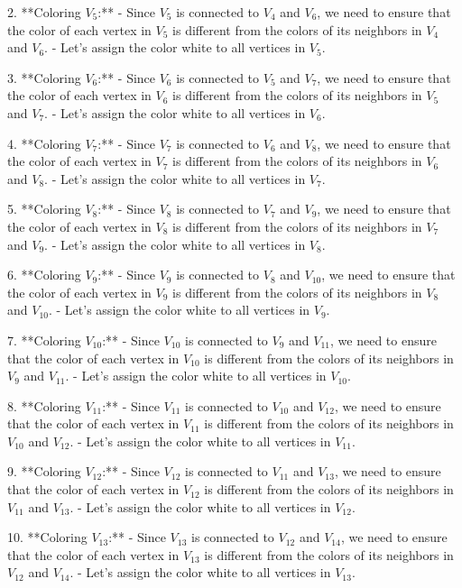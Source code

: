 2. **Coloring \(V_5\):**
   - Since \(V_5\) is connected to \(V_4\) and \(V_6\), we need to ensure that the color of each vertex in \(V_5\) is different from the colors of its neighbors in \(V_4\) and \(V_6\).
   - Let's assign the color white to all vertices in \(V_5\).

3. **Coloring \(V_6\):**
   - Since \(V_6\) is connected to \(V_5\) and \(V_7\), we need to ensure that the color of each vertex in \(V_6\) is different from the colors of its neighbors in \(V_5\) and \(V_7\).
   - Let's assign the color white to all vertices in \(V_6\).

4. **Coloring \(V_7\):**
   - Since \(V_7\) is connected to \(V_6\) and \(V_8\), we need to ensure that the color of each vertex in \(V_7\) is different from the colors of its neighbors in \(V_6\) and \(V_8\).
   - Let's assign the color white to all vertices in \(V_7\).

5. **Coloring \(V_8\):**
   - Since \(V_8\) is connected to \(V_7\) and \(V_9\), we need to ensure that the color of each vertex in \(V_8\) is different from the colors of its neighbors in \(V_7\) and \(V_9\).
   - Let's assign the color white to all vertices in \(V_8\).

6. **Coloring \(V_9\):**
   - Since \(V_9\) is connected to \(V_8\) and \(V_{10}\), we need to ensure that the color of each vertex in \(V_9\) is different from the colors of its neighbors in \(V_8\) and \(V_{10}\).
   - Let's assign the color white to all vertices in \(V_9\).

7. **Coloring \(V_{10}\):**
   - Since \(V_{10}\) is connected to \(V_9\) and \(V_{11}\), we need to ensure that the color of each vertex in \(V_{10}\) is different from the colors of its neighbors in \(V_9\) and \(V_{11}\).
   - Let's assign the color white to all vertices in \(V_{10}\).

8. **Coloring \(V_{11}\):**
   - Since \(V_{11}\) is connected to \(V_{10}\) and \(V_{12}\), we need to ensure that the color of each vertex in \(V_{11}\) is different from the colors of its neighbors in \(V_{10}\) and \(V_{12}\).
   - Let's assign the color white to all vertices in \(V_{11}\).

9. **Coloring \(V_{12}\):**
   - Since \(V_{12}\) is connected to \(V_{11}\) and \(V_{13}\), we need to ensure that the color of each vertex in \(V_{12}\) is different from the colors of its neighbors in \(V_{11}\) and \(V_{13}\).
   - Let's assign the color white to all vertices in \(V_{12}\).

10. **Coloring \(V_{13}\):**
    - Since \(V_{13}\) is connected to \(V_{12}\) and \(V_{14}\), we need to ensure that the color of each vertex in \(V_{13}\) is different from the colors of its neighbors in \(V_{12}\) and \(V_{14}\).
    - Let's assign the color white to all vertices in \(V_{13}\).

